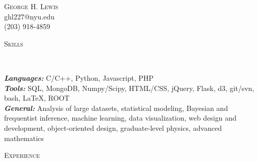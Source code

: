 \documentclass[9pt]{article}
\newenvironment{changemargin}[2]{%
  \begin{list}{}{%
    \setlength{\topsep}{0pt}%
    \setlength{\leftmargin}{#1}%
    \setlength{\rightmargin}{#2}%
    \setlength{\listparindent}{\parindent}%
    \setlength{\itemindent}{\parindent}%
    \setlength{\parsep}{\parskip}%
  }%
  \item[]}{\end{list}
}
\newcommand{\lineover}{
	\begin{changemargin}{-0.05in}{-0.05in}
		\vspace*{-8pt}
		\hrulefill \\
		\vspace*{-2pt}
	\end{changemargin}
}
\newcommand{\header}[1]{
	\begin{changemargin}{-0.5in}{-0.5in}
		\scshape{#1}\\
  	\lineover
	\end{changemargin}
}
\newcommand{\contact}[4]{
	\begin{changemargin}{-0.5in}{-0.5in}
		\begin{center}
			{\Large \scshape {#1}}\\ \smallskip
			{#2}\\ \smallskip 
			{#3}\\ \smallskip
			{#4}\smallskip
		\end{center}
	\end{changemargin}
}
\newenvironment{body} {
	\vspace*{-16pt}
	\begin{changemargin}{-0.25in}{-0.5in}
  }	
	{\end{changemargin}
}
\begin{document}
\contact{George H. Lewis}{ghl227@nyu.edu}{(203) 918-4859}
\smallskip

\smallskip

\header{Skills}
\begin{body}
	\vspace{14pt}
	\emph{\textbf{Languages:}}{} C/C++, Python, Javascript, PHP \\
        \smallskip
        \emph{\textbf{Tools:}}{} SQL, MongoDB, Numpy/Scipy, HTML/CSS, jQuery, Flask, d3, git/svn, bash, \LaTeX{}, ROOT \\
        \smallskip
        \emph{\textbf{General:}}{} Analysis of large datasets, statistical modeling, Bayesian and frequentist inference, machine learning, data visualization, web design and development, object-oriented design, graduate-level physics, advanced mathematics \\
\end{body}

\smallskip

\header{Experience}
\end{document}
